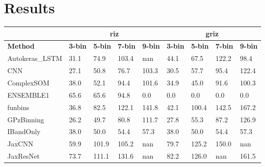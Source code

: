 \documentclass[twocolumn,twocolappendix]{aastex63}
\begin{document}
        




\section{Results}

\begin{table*}[]
\begin{tabular}{|l|llll|llll|}
                & \multicolumn{4}{c|}{\textbf{riz}}      & \multicolumn{4}{c|}{\textbf{griz}}                                \\ \hline
\textbf{Method} & \textbf{3-bin} & \textbf{5-bin} & \textbf{7-bin} & \textbf{9-bin} & \textbf{3-bin} & \textbf{5-bin} & \textbf{7-bin} & \textbf{9-bin} \\ \hline
{\sc Autokeras\_LSTM } & 31.1 & 74.9    & 103.4    & nan    & 44.1             & 67.5             & 122.2             & 98.4\\
{\sc CNN } & 27.1 & 50.8    & 76.7    & 103.3    & 30.5             & 57.7             & 95.4             & 122.4\\
{\sc ComplexSOM } & 38.0 & 52.1    & 94.4    & 101.6    & 34.9             & 45.0             & 91.6             & 100.3\\
{\sc ENSEMBLE1 } & 65.6 & 65.6    & 94.8    & 0.0    & 0.0             & 0.0             & 0.0             & 0.0\\
{\sc funbins } & 36.8 & 82.5    & 122.1    & 141.8    & 42.1             & 100.4             & 142.5             & 167.2\\
{\sc GPzBinning } & 26.2 & 49.7    & 80.8    & 111.7    & 27.8             & 55.3             & 87.2             & 126.9\\
{\sc IBandOnly } & 38.0 & 50.0    & 54.4    & 57.3    & 38.0             & 50.0             & 54.4             & 57.3\\
{\sc JaxCNN } & 59.9 & 101.9    & 105.2    & nan    & 79.7             & 125.2             & 150.0             & nan\\
{\sc JaxResNet } & 73.7 & 111.1    & 131.6    & nan    & 82.2             & 126.0             & nan             & 161.5\\

\end{tabular}
\end{table*}
\end{document}
